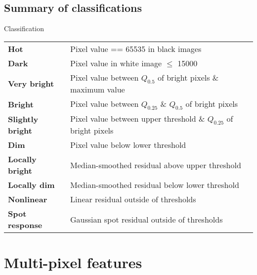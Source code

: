 \documentclass[8pt]{beamer}
\newcommand{\todo}[1]{
	\begin{minipage}{\textwidth}
	\begin{footnotesize}
	\textcolor{purple}{
					\begin{tabular}{p{0.01\textwidth}p{0.95\textwidth}}
						$\bullet$ & #1
					\end{tabular}
					}
	\end{footnotesize}
	\end{minipage}
}
\begin{document}


\subsection{Summary of classifications}

\begin{frame}{Classification} 

	
	\begin{tabular}{p{}p{}}
		\textbf{Hot} & Pixel value == 65535 in black images\\
		\textbf{Dark} & Pixel value in white image $\leq$ 15000\\
		\textbf{Very bright} & Pixel value between $Q_{0.5}$ of bright pixels \& maximum value\\
		\textbf{Bright} & Pixel value between $Q_{0.25}$ \& $Q_{0.5}$ of bright pixels\\
		\textbf{Slightly bright} & Pixel value between upper threshold \& $Q_{0.25}$ of bright pixels\\
		\textbf{Dim} & Pixel value below lower threshold\\
		\textbf{Locally bright} & Median-smoothed residual above upper threshold\\
		\textbf{Locally dim} & Median-smoothed residual below lower threshold\\
		\textbf{Nonlinear} & Linear residual outside of thresholds\\
		\textbf{Spot response} & Gaussian spot residual outside of thresholds
	\end{tabular}

\end{frame}



\section{Multi-pixel features}
\end{document}
